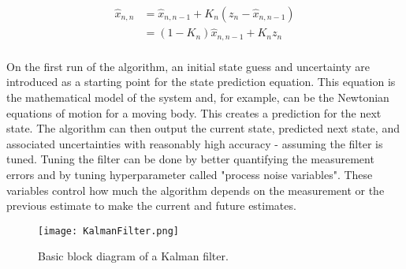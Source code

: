 \begin{equation} \label{eq:kalman_state_update_eq}
    \begin{aligned}
        \hat{x}_{n,n} &= \hat{x}_{n,n-1} + K_n(z_n - \hat{x}_{n,n-1}) \\
                      &= (1-K_n)\hat{x}_{n,n-1} + K_n z_n \\
    \end{aligned}
\end{equation}

On the first run of the algorithm, an initial state guess and uncertainty are introduced as a starting point for the state prediction equation.
This equation is the mathematical model of the system and, for example, can be the Newtonian equations of motion for a moving body.
This creates a prediction for the next state.
The algorithm can then output the current state, predicted next state, and associated uncertainties with reasonably high accuracy - assuming the filter is tuned.
Tuning the filter can be done by better quantifying the measurement errors and by tuning hyperparameter called "process noise variables".
These variables control how much the algorithm depends on the measurement or the previous estimate to make the current and future estimates.

\begin{figure}[h!]
    \caption[Kalman filter block diagram]{Basic block diagram of a Kalman filter.}
    \label{fig:kalman_filter}
    \centering
    \texttt{[image: KalmanFilter.png]}
\end{figure}

